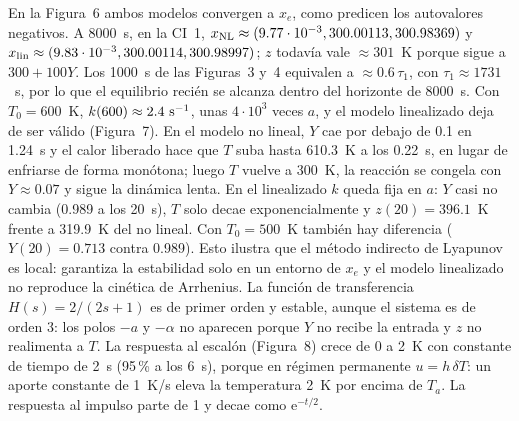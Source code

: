 \documentclass[11pt,a4paper]{article}
\newcommand{\e}{\mathrm{e}}
\begin{document}
En la Figura~6 ambos modelos convergen a $x_e$, como predicen los autovalores negativos. A 8000~s, en la CI~1, $x_{\rm NL}\approx(9.77\cdot10^{-3},300.00113,300.98369)$ y $x_{\rm lin}\approx(9.83\cdot10^{-3},300.00114,300.98997)$; $z$ todavía vale $\approx301$~K porque sigue a $300+100Y$. Los 1000~s de las Figuras~3 y~4 equivalen a $\approx0.6\,\tau_1$, con $\tau_1\approx1731$~s, por lo que el equilibrio recién se alcanza dentro del horizonte de 8000~s.
Con $T_0=600$~K, $k(600)\approx2.4\ {\rm s}^{-1}$, unas $4\cdot10^{3}$ veces $a$, y el modelo linealizado deja de ser válido (Figura~7). En el modelo no lineal, $Y$ cae por debajo de 0.1 en 1.24~s y el calor liberado hace que $T$ suba hasta 610.3~K a los 0.22~s, en lugar de enfriarse de forma monótona; luego $T$ vuelve a 300~K, la reacción se congela con $Y\approx0.07$ y sigue la dinámica lenta. En el linealizado $k$ queda fija en $a$: $Y$ casi no cambia (0.989 a los 20~s), $T$ solo decae exponencialmente y $z(20)=396.1$~K frente a 319.9~K del no lineal. Con $T_0=500$~K también hay diferencia ($Y(20)=0.713$ contra 0.989). Esto ilustra que el método indirecto de Lyapunov es local: garantiza la estabilidad solo en un entorno de $x_e$ y el modelo linealizado no reproduce la cinética de Arrhenius.
La función de transferencia $H(s)=2/(2s+1)$ es de primer orden y estable, aunque el sistema es de orden 3: los polos $-a$ y $-\alpha$ no aparecen porque $Y$ no recibe la entrada y $z$ no realimenta a $T$. La respuesta al escalón (Figura~8) crece de 0 a 2~K con constante de tiempo de 2~s (95\,\% a los 6~s), porque en régimen permanente $u=h\,\delta T$: un aporte constante de 1~K/s eleva la temperatura 2~K por encima de $T_a$. La respuesta al impulso parte de 1 y decae como $\e^{-t/2}$.
\end{document}
